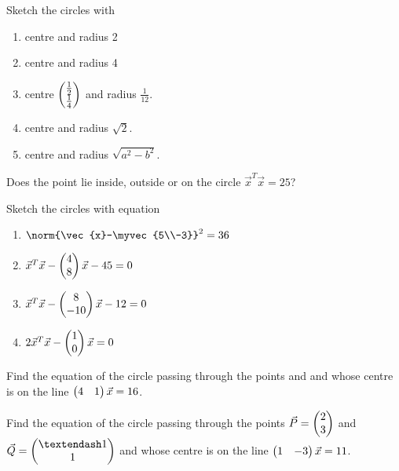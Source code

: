 \solution 

\item Sketch the circles with 
\begin{enumerate}
\item centre  and radius 2
\item centre  and radius 4
\item centre $\begin{pmatrix}\frac{1}{2}\\ \frac{1}{4}\end{pmatrix}$ and radius $\frac{1}{12}$.
\item centre  and radius $\sqrt{2}$.
\item centre  and radius $\sqrt{a^2-b^2}$.
\end{enumerate}
\solution 

\item  Does the point  lie inside, outside or on the circle $\vec{x}^T\vec{x} = 25$?
\\
\solution 

\item Sketch the circles with equation
\begin{enumerate}
\item $\norm{\vec{x}-\myvec{5\\-3}}^2 = 36$
\item $\vec{x}^T\vec{x}-\begin{pmatrix}4\\8\end{pmatrix}\vec{x} -45= 0$
\item $\vec{x}^T\vec{x}-\begin{pmatrix}8\\-10\end{pmatrix}\vec{x} -12= 0$
\item $2\vec{x}^T\vec{x}-\begin{pmatrix}1\\0\end{pmatrix}\vec{x} = 0$
\end{enumerate}
\solution 

\item Find the equation of the circle passing through the points  and  and whose centre is on the line $\begin{pmatrix}4 & 1\end{pmatrix}\vec{x} = 16$.
\\
\solution 

\item Find the equation of the circle passing through the points $\vec{P} =\begin{pmatrix}2\\3\end{pmatrix}$ and $\vec{Q} = \myvec{–1\\1}$ and whose centre is on the line $\begin{pmatrix}1 & -3\end{pmatrix}\vec{x} = 11$.
\solution 

